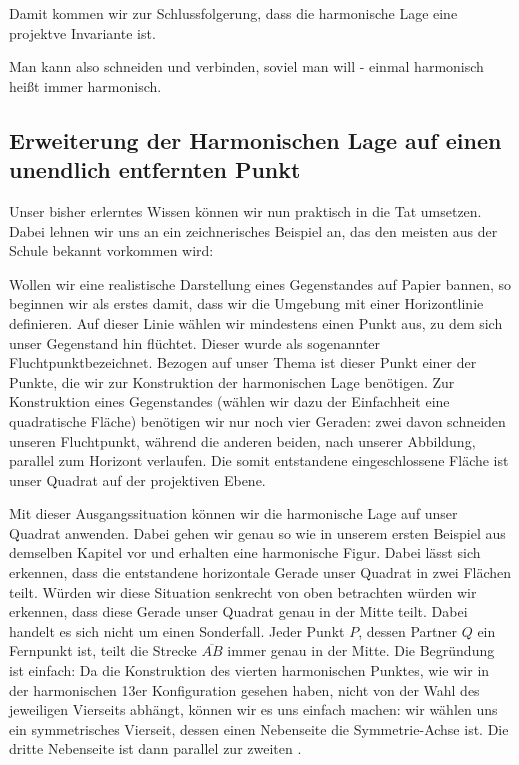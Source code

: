 \documentclass[12pt,a4paper]{article}
\begin{document}
Damit kommen wir zur Schlussfolgerung, dass die harmonische Lage eine projektve Invariante ist.

\glqq Man kann also schneiden und verbinden, soviel man will - einmal harmonisch heißt immer harmonisch.~\citep[s.~][S.~49]{projektiveGeometrie}\grqq

\subsection{Erweiterung der Harmonischen Lage auf einen unendlich entfernten Punkt}

Unser bisher erlerntes Wissen können wir nun praktisch in die Tat umsetzen. Dabei lehnen wir uns an ein zeichnerisches Beispiel an, das den meisten aus der Schule bekannt vorkommen wird:

Wollen wir eine realistische Darstellung eines Gegenstandes auf Papier bannen, so beginnen wir als erstes damit, dass wir die Umgebung mit einer Horizontlinie definieren. Auf dieser Linie wählen wir mindestens einen Punkt aus, zu dem sich unser Gegenstand hin \glqq flüchtet\grqq . Dieser wurde als sogenannter \glqq Fluchtpunkt\grqq bezeichnet. Bezogen auf unser Thema ist dieser Punkt einer der Punkte, die wir zur Konstruktion der harmonischen Lage benötigen. Zur Konstruktion eines Gegenstandes (wählen wir dazu der Einfachheit eine quadratische Fläche) benötigen wir nur noch vier Geraden: zwei davon schneiden unseren Fluchtpunkt, während die anderen beiden, nach unserer Abbildung, parallel zum Horizont verlaufen. Die somit entstandene eingeschlossene Fläche ist unser Quadrat auf der projektiven Ebene.

Mit dieser Ausgangssituation können wir die harmonische Lage auf unser Quadrat anwenden. Dabei gehen wir genau so wie in unserem ersten Beispiel aus demselben Kapitel vor und erhalten eine harmonische Figur. Dabei lässt sich erkennen, dass die entstandene horizontale Gerade unser Quadrat in zwei Flächen teilt. Würden wir diese Situation senkrecht von oben betrachten würden wir erkennen, dass diese Gerade unser Quadrat genau in der Mitte teilt. Dabei handelt es sich nicht um einen Sonderfall. Jeder Punkt $P$, dessen Partner $Q$ ein Fernpunkt ist, teilt die Strecke $\overline{A B}$ immer genau in der Mitte.
\newline
Die Begründung ist einfach: Da die Konstruktion des vierten harmonischen Punktes, wie wir in der harmonischen 13er Konfiguration gesehen haben, nicht von der Wahl des jeweiligen Vierseits abhängt, können wir es uns einfach machen: wir wählen uns ein symmetrisches Vierseit, dessen einen Nebenseite die Symmetrie-Achse ist. Die dritte Nebenseite ist dann parallel zur zweiten \citep[vgl.~][S.~50]{projektiveGeometrie}.
\end{document}
